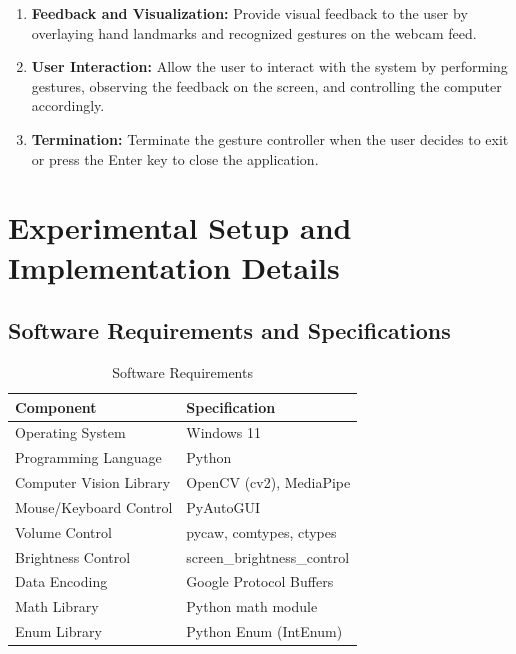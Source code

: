 \documentclass[12pt,a4paper]{report}
\begin{document}
\begin{enumerate}
\begin{enumerate}
  \item \textbf{Feedback and Visualization:} Provide visual feedback to the user by overlaying
    hand landmarks and recognized gestures on the webcam feed.

  \item \textbf{User Interaction:} Allow the user to interact with the system by performing
    gestures, observing the feedback on the screen, and controlling the computer accordingly.

  \item \textbf{Termination:} Terminate the gesture controller when the user decides to exit
    or press the Enter key to close the application.
\end{enumerate}

\chapter{Experimental Setup and Implementation Details}

\section{Software Requirements and Specifications}

\begin{table}[ht]
\centering
\caption{Software Requirements}
\label{tab:software}
\begin{tabular}{|l|l|}
\hline
\textbf{Component} & \textbf{Specification} \\
\hline
Operating System        & Windows 11 \\
\hline
Programming Language    & Python \\
\hline
Computer Vision Library & OpenCV (cv2), MediaPipe \\
\hline
Mouse/Keyboard Control  & PyAutoGUI \\
\hline
Volume Control          & pycaw, comtypes, ctypes \\
\hline
Brightness Control      & screen\_brightness\_control \\
\hline
Data Encoding           & Google Protocol Buffers \\
\hline
Math Library            & Python math module \\
\hline
Enum Library            & Python Enum (IntEnum) \\
\hline
\end{tabular}
\end{table}

\end{enumerate}
\end{document}
